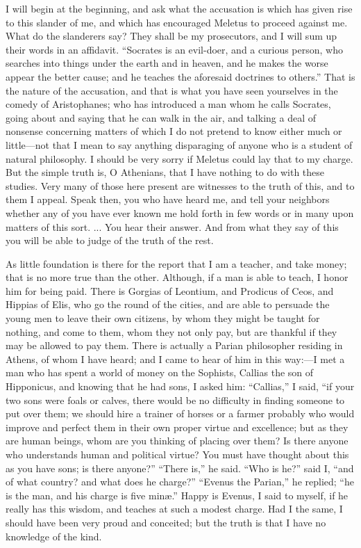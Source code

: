 \documentclass[12pt]{article}
\begin{document}
I will begin at the beginning, and ask what the accusation is which has given
rise to this slander of me, and which has encouraged Meletus to proceed against
me. What do the slanderers say? They shall be my prosecutors, and I will sum up
their words in an affidavit. ``Socrates is an evil-doer, and a curious person,
who searches into things under the earth and in heaven, and he makes the worse
appear the better cause; and he teaches the aforesaid doctrines to others.''
That is the nature of the accusation, and that is what you have seen yourselves
in the comedy of Aristophanes; who has introduced a man whom he calls Socrates,
going about and saying that he can walk in the air, and talking a deal of
nonsense concerning matters of which I do not pretend to know either much or
little---not that I mean to say anything disparaging of anyone who is a student
of natural philosophy. I should be very sorry if Meletus could lay that to my
charge. But the simple truth is, O Athenians, that I have nothing to do with
these studies. Very many of those here present are witnesses to the truth of
this, and to them I appeal. Speak then, you who have heard me, and tell your
neighbors whether any of you have ever known me hold forth in few words or in
many upon matters of this sort. ... You hear their answer. And from what they
say of this you will be able to judge of the truth of the rest.

As little foundation is there for the report that I am a teacher,
and take money; that is no more true than the other. Although, if
a man is able to teach, I honor him for being paid. There is Gorgias
of Leontium, and Prodicus of Ceos, and Hippias of Elis, who go the
round of the cities, and are able to persuade the young men to leave
their own citizens, by whom they might be taught for nothing, and
come to them, whom they not only pay, but are thankful if they may
be allowed to pay them. There is actually a Parian philosopher residing
in Athens, of whom I have heard; and I came to hear of him in this
way:---I met a man who has spent a world of money on the Sophists,
Callias the son of Hipponicus, and knowing that he had sons, I asked
him: ``Callias,'' I said, ``if your two sons were foals or calves, there
would be no difficulty in finding someone to put over them; we should
hire a trainer of horses or a farmer probably who would improve and
perfect them in their own proper virtue and excellence; but as they
are human beings, whom are you thinking of placing over them? Is there
anyone who understands human and political virtue? You must have thought
about this as you have sons; is there anyone?'' ``There is,'' he said.
``Who is he?'' said I, ``and of what country? and what does he charge?''
``Evenus the Parian,'' he replied; ``he is the man, and his charge is
five min{\ae}.'' Happy is Evenus, I said to myself, if he really has this
wisdom, and teaches at such a modest charge. Had I the same, I should
have been very proud and conceited; but the truth is that I have no
knowledge of the kind.
\end{document}
